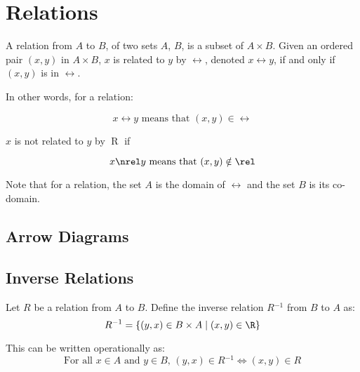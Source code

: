 \documentclass[11pt]{article}
\newcommand\inv{\ensuremath{^{-1}}}
\begin{document}
\section{Relations}



\begin{definition}[Relation]\label{def:relation}
    A relation from $A$ to $B$, of two sets $A$, $B$, is a subset of $A \times B$.
    Given an ordered pair $(x, y)$ in $A \times B$, $x$ is related to $y$ by $\rel$,
    denoted $x \rel y$, if and only if $(x, y)$ is in $\rel$. 
    
    In other words, for a relation:

    \begin{equation*}
        x \rel y \text{ means that } (x,y) \in \rel
    \end{equation*}

    $x$ is not related to $y$ by $\mathrel{R}$ if 

    \begin{equation*}
        x \nrel y \text { means that } (x,y) \notin \rel
    \end{equation*}

    Note that for a relation, the set $A$ is the domain of
    $\rel$ and the set $B$ is its co-domain.
    
\end{definition}

\subsection{Arrow Diagrams}

\subsection{Inverse Relations}

\begin{definition}\label{def:inverse-relation}
    Let $R$ be a relation from $A$ to $B$. Define the inverse relation $R\inv$ from $B$ to $A$ as:
    \begin{equation*}
        R\inv = \{(y, x) \in B \times A \mid (x, y) \in \R \}
    \end{equation*}
    
    This can be written operationally as:
    \begin{equation*}
        \text{For all $x \in A$ and $y \in B$, } (y, x) \in R\inv \iff (x,y) \in R
    \end{equation*}
\end{definition}
\end{document}
